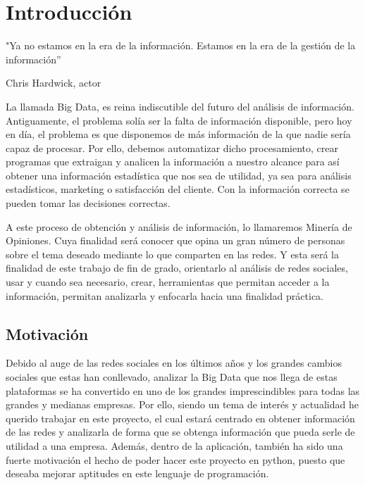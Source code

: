



	\chapter{Introducción}
	\epigraph{"Ya no estamos en la era de la información. Estamos en la era de la gestión de la información” }{Chris Hardwick, actor}
	
		La llamada Big Data, es reina indiscutible del futuro del análisis de información. Antiguamente, el problema solía ser la falta de información disponible, pero hoy en día, el problema es que disponemos de más información de la que nadie sería capaz de procesar. Por ello, debemos automatizar dicho procesamiento, crear programas que extraigan y analicen la información a nuestro alcance para así obtener una información estadística que nos sea de utilidad, ya sea para análisis estadísticos, marketing o satisfacción del cliente. Con la información correcta se pueden tomar las decisiones correctas.
		
		A este proceso de obtención y análisis de información, lo llamaremos Minería de Opiniones. Cuya finalidad será conocer que opina un gran número de personas sobre el tema deseado mediante lo que comparten en las redes. Y esta será la finalidad de este trabajo de fin de grado, orientarlo al análisis de redes sociales, usar y cuando sea necesario, crear, herramientas que permitan acceder a la información, permitan analizarla y enfocarla hacia una finalidad práctica. 
		
		
	
	\section{Motivación}
	
	Debido al auge de las redes sociales en los últimos años y los grandes cambios sociales que estas han conllevado, analizar la Big Data que nos llega de estas plataformas se ha convertido en uno de los grandes imprescindibles para todas las grandes y medianas empresas. Por ello, siendo un tema de interés y actualidad he querido trabajar en este proyecto, el cual estará centrado en obtener información de las redes y analizarla de forma que se obtenga información que pueda serle de utilidad a una empresa. Además, dentro de la aplicación, también ha sido una fuerte motivación el hecho de poder hacer este proyecto en python, puesto que deseaba mejorar aptitudes en este lenguaje de programación. 
	
